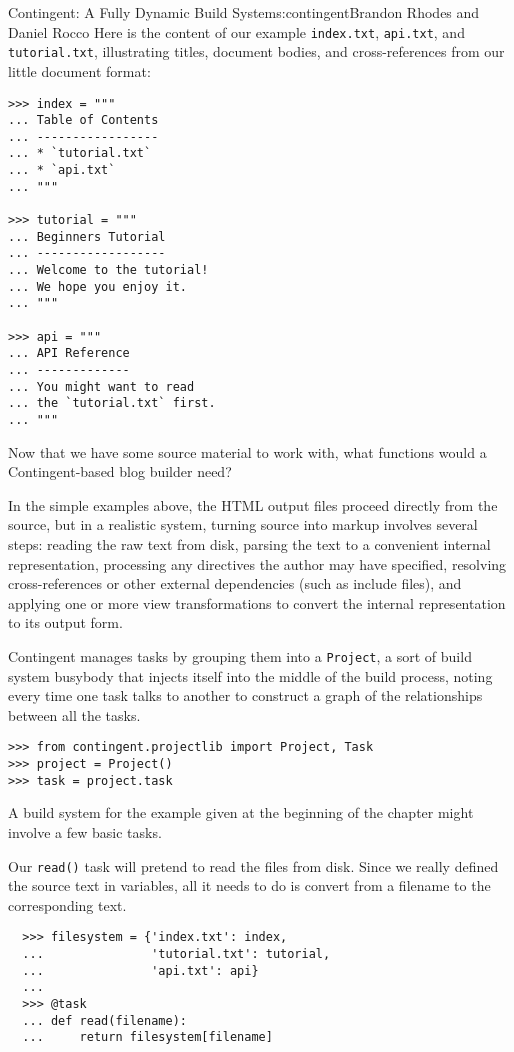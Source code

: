 \begin{aosachapter}{Contingent: A Fully Dynamic Build System}{s:contingent}{Brandon Rhodes and Daniel Rocco}
Here is the content of our example \texttt{index.txt}, \texttt{api.txt},
and \texttt{tutorial.txt}, illustrating titles, document bodies, and
cross-references from our little document format:

\begin{verbatim}
>>> index = """
... Table of Contents
... -----------------
... * `tutorial.txt`
... * `api.txt`
... """

>>> tutorial = """
... Beginners Tutorial
... ------------------
... Welcome to the tutorial!
... We hope you enjoy it.
... """

>>> api = """
... API Reference
... -------------
... You might want to read
... the `tutorial.txt` first.
... """
\end{verbatim}

Now that we have some source material to work with, what functions would
a Contingent-based blog builder need?

In the simple examples above, the HTML output files proceed directly
from the source, but in a realistic system, turning source into markup
involves several steps: reading the raw text from disk, parsing the text
to a convenient internal representation, processing any directives the
author may have specified, resolving cross-references or other external
dependencies (such as include files), and applying one or more view
transformations to convert the internal representation to its output
form.

Contingent manages tasks by grouping them into a \texttt{Project}, a
sort of build system busybody that injects itself into the middle of the
build process, noting every time one task talks to another to construct
a graph of the relationships between all the tasks.

\begin{verbatim}
>>> from contingent.projectlib import Project, Task
>>> project = Project()
>>> task = project.task
\end{verbatim}

A build system for the example given at the beginning of the chapter
might involve a few basic tasks.

Our \texttt{read()} task will pretend to read the files from disk. Since
we really defined the source text in variables, all it needs to do is
convert from a filename to the corresponding text.

\begin{verbatim}
  >>> filesystem = {'index.txt': index,
  ...               'tutorial.txt': tutorial,
  ...               'api.txt': api}
  ...
  >>> @task
  ... def read(filename):
  ...     return filesystem[filename]
\end{verbatim}


\end{aosachapter}
